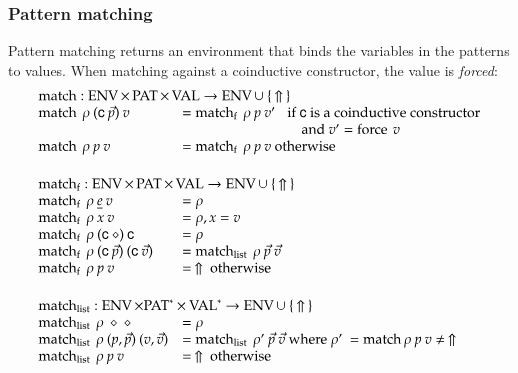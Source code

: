 \subsubsection{Pattern matching}
Pattern matching returns an environment that binds the variables in the patterns to values.
When matching against a coinductive constructor, the value is \emph{forced}:
\[
\begin{array}{ll}
\multicolumn{2}{l}{\match : \Env \times \Pat \times \Val \ra \Env \cup \: \{ \: \stuck \: \} }\\
\match \: \rho \: (\cc \: \vec{p}) \: v & = \matchf \: \rho \: p \: v' \spc \mbox{if  } \cc  \mbox{ is a coinductive constructor}\\
& \spcx \spcx \spcx \mbox{and } v' = \forc \: v \\
\match \: \rho \: p \: v & = \matchf \: \rho \: p \: v \mbox{ otherwise}\\
\vs\\
\multicolumn{2}{l}{\matchf : \Env \times \Pat \times \Val \ra \Env \cup \: \{ \: \stuck \: \} }\\
\matchf \: \rho \: \inacc{e} \: v & = \rho \\
\matchf \: \rho \: x \: v & = \ins{\rho}{x}{v} \\
\matchf \: \rho \: (\cc \: \diamond) \: \cc & = \rho \\
\matchf \: \rho \: (\cc \: \vec{p}) \: (\cc \: \vec{v}) & = \matchList \: \rho \: \vec{p} \: \vec{v} \\
\matchf \: \rho \: p \: v & = \: \stuck \mbox{ otherwise}\\
\vs\\
\multicolumn{2}{l}{\matchList : \Env \times \ves{\Pat} \times \ves{\Val} \ra \Env \cup \: \{ \: \stuck \: \} }\\
\matchList \: \rho \: \diamond \: \diamond & = \rho \\
\matchList \: \rho \: (p,\vec{p}) \: (v,\vec{v}) & = \matchList \: \rho' \: \vec{p} \: \vec{v} \mbox{ where } \rho' \: = \match \rho \: p \: v \neq \: \stuck \\
\matchList \: \rho \: p \: v & = \: \stuck \mbox { otherwise } \\
\end{array}
\]


